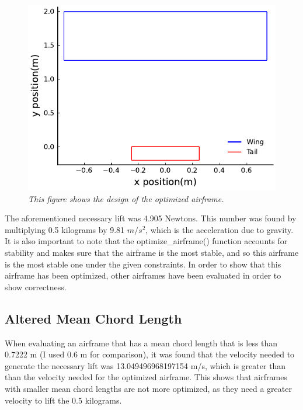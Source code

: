 \documentclass{journal}
\begin{document}
	\begin{figure}[H]
		\includegraphics{../graphics/ideal_design.pdf}
		\caption{\emph{This figure shows the design of the optimized airframe.}}
		\label{fig:ideal_design}
	\end{figure}
	
	The aforementioned necessary lift was 4.905 Newtons. This number was found by multiplying 0.5 kilograms by 9.81 \(m/s^2\), which is the acceleration due to gravity. It is also important to note that the optimize\_airframe() function accounts for stability and makes sure that the airframe is the most stable, and so this airframe is the most stable one under the given constraints. In order to show that this airframe has been optimized, other airframes have been evaluated in order to show correctness.\\
	
	\subsection{Altered Mean Chord Length}
	
	When evaluating an airframe that has a mean chord length that is less than 0.7222 m (I used 0.6 m for comparison), it was found that the velocity needed to generate the necessary lift was 13.049496968197154 m/s, which is greater than than the velocity needed for the optimized airframe. This shows that airframes with smaller mean chord lengths are not more optimized, as they need a greater velocity to lift the 0.5 kilograms.\\
	
\end{document}
